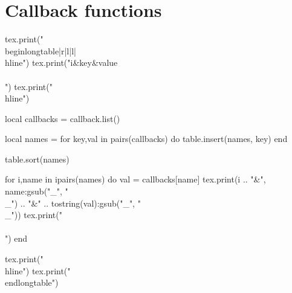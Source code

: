 \documentclass{article}
\begin{document}
\section*{Callback functions}

\begin{luacode*}
tex.print("\\begin{longtable}{|r|l|l|}\\hline")
tex.print("i&key&value\\\\")
tex.print("\\hline")

local callbacks = callback.list()

local names = {}
for key,val in pairs(callbacks) do
    table.insert(names, key)
end

table.sort(names)

for i,name in ipairs(names) do
    val = callbacks[name]
    tex.print(i .. "&", name:gsub("_", "\\_") .. "&" .. tostring(val):gsub("_", "\\_"))
    tex.print("\\\\")
end

tex.print("\\hline")
tex.print("\\end{longtable}")
\end{luacode*}
\end{document}
